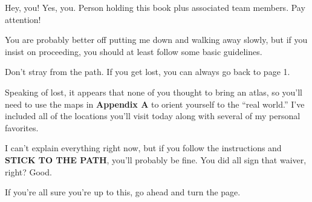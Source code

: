\pagestyle{empty}
\vspace*{\fill}
Hey, you! Yes, you. Person holding this book plus associated team members. Pay attention!

You are probably better off putting me down and walking away slowly, but if you insist on proceeding, you should at least follow some basic guidelines.

Don't stray from the path. If you get lost, you can always go back to page 1.

Speaking of lost, it appears that none of you thought to bring an atlas, so you'll need to use the maps in \textbf{Appendix A} to orient yourself to the ``real world.'' I've included all of the locations you'll visit today along with several of my personal favorites.

I can't explain everything right now, but if you follow the instructions and \textbf{STICK TO THE PATH}, you'll probably be fine. You did all sign that waiver, right? Good.

If you're all sure you're up to this, go ahead and turn the page.
\vspace*{\fill}
\newpage
\blankpage
